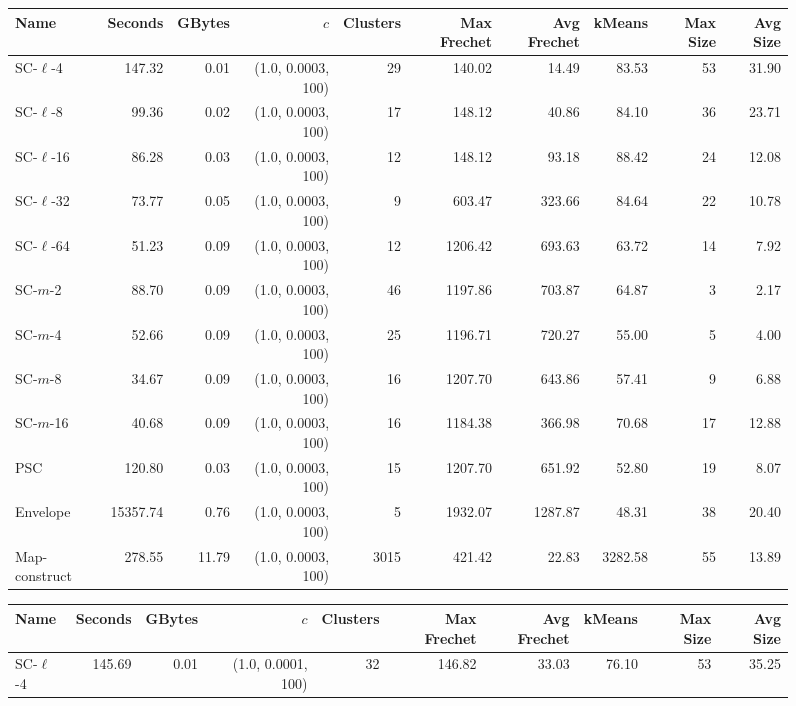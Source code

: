 
    \begin{figure} \begin{center}
    \begin{minipage}{\textwidth}
    {
    \begin{tabular}{@{}lrrrrrrrrr@{}}
        \toprule
        Name & Seconds & GBytes & $c$ & Clusters & Max Frechet & Avg Frechet & kMeans & Max Size & Avg Size\\
        \midrule
        SC-$\ell$-4 & 147.32 & 0.01 & (1.0, 0.0003, 100) & 29 & 140.02 & 14.49 & 83.53 & 53 & 31.90\\
SC-$\ell$-8 & 99.36 & 0.02 & (1.0, 0.0003, 100) & 17 & 148.12 & 40.86 & 84.10 & 36 & 23.71\\
SC-$\ell$-16 & 86.28 & 0.03 & (1.0, 0.0003, 100) & 12 & 148.12 & 93.18 & 88.42 & 24 & 12.08\\
SC-$\ell$-32 & 73.77 & 0.05 & (1.0, 0.0003, 100) & 9 & 603.47 & 323.66 & 84.64 & 22 & 10.78\\
SC-$\ell$-64 & 51.23 & 0.09 & (1.0, 0.0003, 100) & 12 & 1206.42 & 693.63 & 63.72 & 14 & 7.92\\
SC-$m$-2 & 88.70 & 0.09 & (1.0, 0.0003, 100) & 46 & 1197.86 & 703.87 & 64.87 & 3 & 2.17\\
SC-$m$-4 & 52.66 & 0.09 & (1.0, 0.0003, 100) & 25 & 1196.71 & 720.27 & 55.00 & 5 & 4.00\\
SC-$m$-8 & 34.67 & 0.09 & (1.0, 0.0003, 100) & 16 & 1207.70 & 643.86 & 57.41 & 9 & 6.88\\
SC-$m$-16 & 40.68 & 0.09 & (1.0, 0.0003, 100) & 16 & 1184.38 & 366.98 & 70.68 & 17 & 12.88\\
PSC& 120.80 & 0.03 & (1.0, 0.0003, 100) & 15 & 1207.70 & 651.92 & 52.80 & 19 & 8.07\\
Envelope & 15357.74 & 0.76 & (1.0, 0.0003, 100) & 5 & 1932.07 & 1287.87 & 48.31 & 38 & 20.40\\
Map-construct & 278.55 & 11.79 & (1.0, 0.0003, 100) & 3015 & 421.42 & 22.83 & 3282.58 & 55 & 13.89\\
        \bottomrule
    \end{tabular}
    }
    {
    \begin{tabular}{@{}lrrrrrrrrr@{}}
        \toprule
        Name & Seconds & GBytes & $c$ & Clusters & Max Frechet & Avg Frechet & kMeans & Max Size & Avg Size\\
        \midrule
        SC-$\ell$-4 & 145.69 & 0.01 & (1.0, 0.0001, 100) & 32 & 146.82 & 33.03 & 76.10 & 53 & 35.25\\

\end{tabular}}
\end{minipage}
\end{center}
\end{figure}
